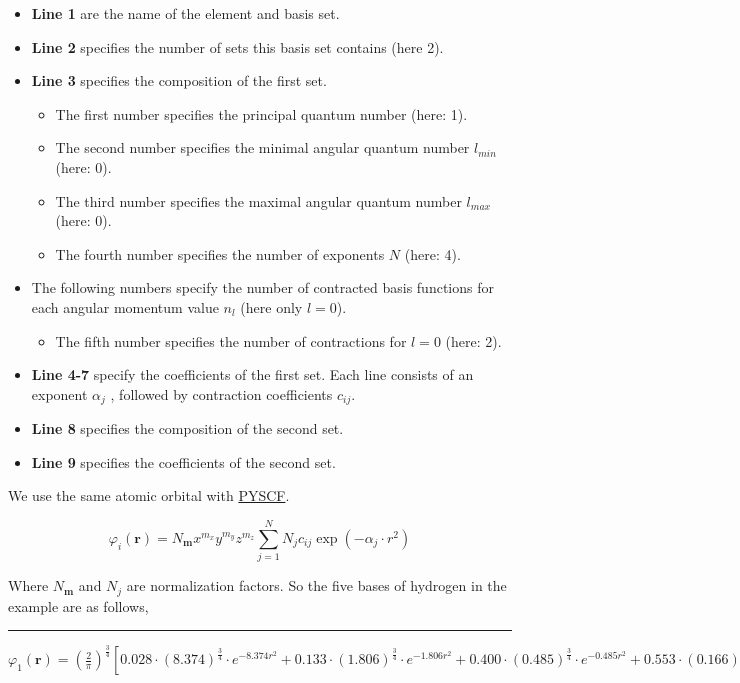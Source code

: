 \documentclass{article}
\begin{document}
        \begin{itemize}
            \item[] \textbf{Line 1} are the name of the element and basis set.
            \item[] \textbf{Line 2} specifies the number of sets this basis set contains (here 2).
            \item[] \textbf{Line 3} specifies the composition of the first set.
            \begin{itemize}
                \item[] The first number specifies the principal quantum number (here: 1).
                \item[] The second number specifies the minimal angular quantum number $l_{min}$ (here: 0).
                \item[] The third number specifies the maximal angular quantum number $l_{max}$ (here: 0).
                \item[] The fourth number specifies the number of exponents $N$ (here: 4).
            \end{itemize}
            \item[] The following numbers specify the number of contracted basis functions for each angular momentum value $n_l$ (here only $l=0$).
            \begin{itemize}
                \item[] The fifth number specifies the number of contractions for $l=0$ (here: 2).
            \end{itemize}
            \item[] \textbf{Line 4-7} specify the coefficients of the first set. Each line consists of an exponent $\alpha_j$
            , followed by contraction coefficients $c_{ij}$.
            \item[] \textbf{Line 8} specifies the composition of the second set.
            \item[] \textbf{Line 9} specifies the coefficients of the second set.
        \end{itemize}

        We use the same atomic orbital with \href{https://pyscf.org/}{PYSCF}.

        \begin{equation}
            \varphi_i(\textbf{r}) = N_{\textbf{m}}x^{m_x}y^{m_y}z^{m_z}\sum_{j=1}^NN_{j}c_{ij}\exp\left(-\alpha_{j}\cdot r^2\right)
        \end{equation}

        Where $N_{\textbf{m}}$ and $N_{j}$ are normalization factors.
        So the five bases of hydrogen in the example are as follows,
        ~\\
        \hrule
        $ \varphi_1(\textbf{r}) = \left(\frac{2}{\pi}\right)^{\frac{3}{4}}\left[
            0.028\cdot(8.374)^{\frac{3}{4}}\cdot e^{-8.374r^2}+
            0.133\cdot(1.806)^{\frac{3}{4}}\cdot e^{-1.806r^2}+
            0.400\cdot(0.485)^{\frac{3}{4}}\cdot e^{-0.485r^2}+
            0.553\cdot(0.166)^{\frac{3}{4}}\cdot e^{-0.166r^2}\right] $
\end{document}
